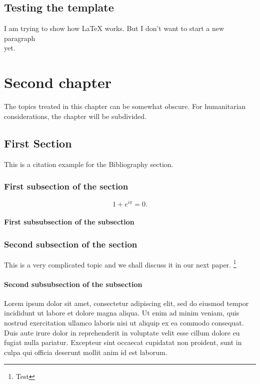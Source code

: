 \documentclass[hidelinks,pdftex,phd]{pittetd}
\begin{document}
\section{Testing the template}
I am trying to show how LaTeX works.
But I don't want to start a new paragraph \\ yet.
\cite{DUMMY:1}


\chapter{Second chapter}
The topics treated in this chapter can be somewhat obscure. For humanitarian considerations, the chapter will be subdivided.
\section{First Section}
This is a citation example for the Bibliography section.\cite{DUMMY:2}


\subsection{First subsection of the section}

\begin{equation} \label{EQ1}
     1 + e^{i \pi} = 0.
\end{equation}
\subsubsection{First subsubsection of the subsection}
\subsection{Second subsection of the section}
This is a very complicated topic and we shall discuss it in our next paper.\cite{DUMMY:11}
\footnote{Test}
\subsubsection{Second subsubsection of the subsection}
Lorem ipsum dolor sit amet, consectetur adipiscing elit, sed do eiusmod tempor incididunt ut labore et dolore magna aliqua.\cite{DUMMY:3} Ut enim ad minim veniam, quis nostrud exercitation ullamco laboris nisi ut aliquip ex ea commodo consequat. Duis aute irure dolor in reprehenderit in voluptate velit esse cillum dolore eu fugiat nulla pariatur.\cite{DUMMY:4} Excepteur sint occaecat cupidatat non proident, sunt in culpa qui officia deserunt mollit anim id est laborum.\cite{DUMMY:5}
\end{document}
